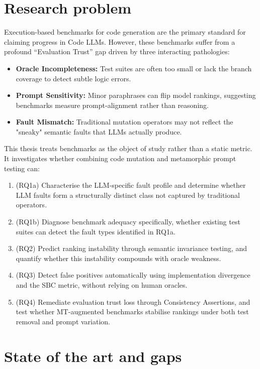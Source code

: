 \documentclass[11pt,a4paper]{article}
\begin{document}
\section{Research problem}
Execution-based benchmarks for code generation are the primary standard for claiming progress in Code LLMs. However, these benchmarks suffer from a profound “Evaluation Trust” gap driven by three interacting pathologies:
\begin{itemize}
    \item \textbf{Oracle Incompleteness:} Test suites are often too small or lack the branch coverage to detect subtle logic errors.
    \item \textbf{Prompt Sensitivity:} Minor paraphrases can flip model rankings, suggesting benchmarks measure prompt-alignment rather than reasoning.
    \item \textbf{Fault Mismatch:} Traditional mutation operators may not reflect the "sneaky" semantic faults that LLMs actually produce.
\end{itemize}
This thesis treats benchmarks as the object of study rather than a static metric. It investigates whether combining code mutation and metamorphic prompt testing can:
\begin{enumerate}
    \item (RQ1a) Characterise the LLM-specific fault profile and determine whether LLM faults form a structurally distinct class not captured by traditional operators.
    \item (RQ1b) Diagnose benchmark adequacy specifically, whether existing test suites can detect the fault types identified in RQ1a.
    \item (RQ2) Predict ranking instability through semantic invariance testing, and quantify whether this instability compounds with oracle weakness.
    \item (RQ3) Detect false positives automatically using implementation divergence and the SBC metric, without relying on human oracles.
    \item (RQ4) Remediate evaluation trust loss through Consistency Assertions, and test whether MT-augmented benchmarks stabilise rankings under both test removal and prompt variation.
\end{enumerate}

\section{State of the art and gaps}
\end{document}
